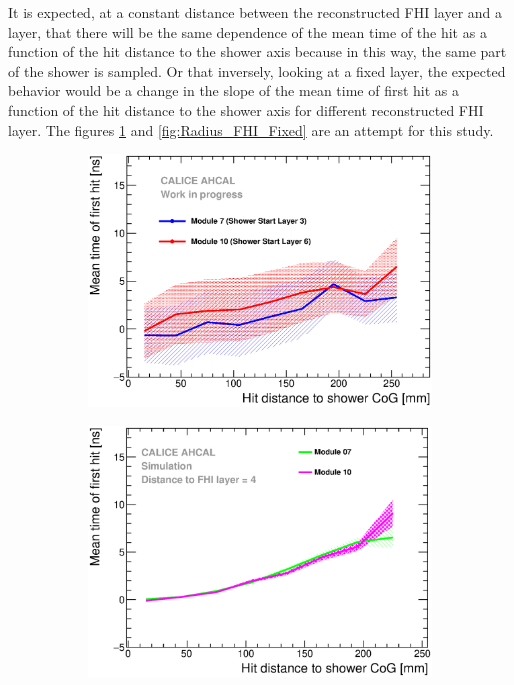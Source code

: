 It is expected, at a constant distance between the reconstructed FHI layer and a layer, that there will be the same dependence of the mean time of the hit as a function of the hit distance to the shower axis because in this way, the same part of the shower is sampled. Or that inversely, looking at a fixed layer, the expected behavior would be a change in the slope of the mean time of first hit as a function of the hit distance to the shower axis for different reconstructed FHI layer. The figures \ref{fig:Radius_FHI} and \ref{fig:Radius_FHI_Fixed} are an attempt for this study.

\begin{figure}[htbp!]
	\begin{subfigure}[t]{0.49\textwidth}
		\centering
		\includegraphics[width=1\textwidth]{../Thesis_Plots/Timing/Pions/Plots/Timing_Radius_Comparison_ShortAsymRange_ShowerStart.eps}
		\caption{}\label{fig:Radius_FHI}
	\end{subfigure}
	\hfill
	\begin{subfigure}[t]{0.49\textwidth}
		\centering
		\includegraphics[width=1\textwidth]{../Thesis_Plots/Timing/Pions/Plots/Radius_ShowerStartTruth.eps}

\end{subfigure}
\end{figure}
